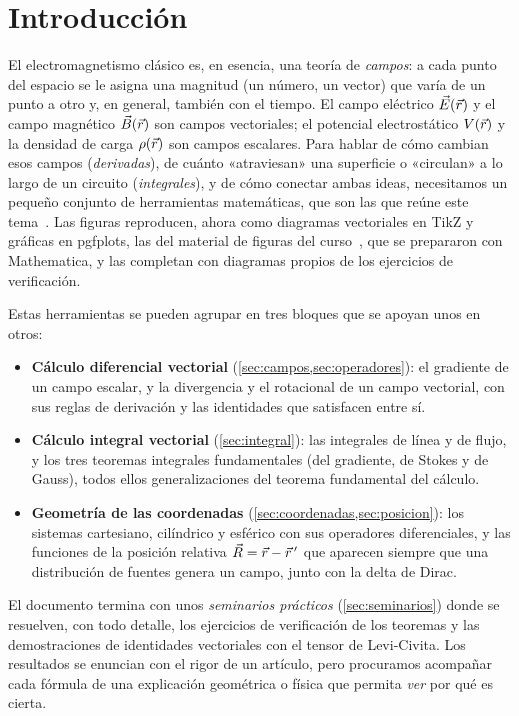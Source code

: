 \section{Introducción}\label{sec:introduccion}
El electromagnetismo clásico es, en esencia, una teoría de \emph{campos}: a
cada punto del espacio se le asigna una magnitud (un número, un vector) que
varía de un punto a otro y, en general, también con el tiempo. El campo
eléctrico $\vec{E}(\vec{r})$ y el campo magnético $\vec{B}(\vec{r})$ son campos
vectoriales; el potencial electrostático $V(\vec{r})$ y la densidad de carga
$\rho(\vec{r})$ son campos escalares. Para hablar de cómo cambian esos campos
(\emph{derivadas}), de cuánto «atraviesan» una superficie o «circulan» a lo
largo de un circuito (\emph{integrales}), y de cómo conectar ambas ideas,
necesitamos un pequeño conjunto de herramientas matemáticas, que son las que
reúne este tema~\cite{NAVAS,GRIFFITHS,ARFKEN}. Las figuras reproducen, ahora como
diagramas vectoriales en TikZ y gráficas en pgfplots, las del material de
figuras del curso~\cite{FIGURAS-T0}, que se prepararon con Mathematica, y las completan con
diagramas propios de los ejercicios de verificación.

Estas herramientas se pueden agrupar en tres bloques que se apoyan unos en
otros:
\begin{itemize}
  \item \textbf{Cálculo diferencial vectorial} (\cref{sec:campos,sec:operadores}):
        el gradiente de un campo escalar, y la divergencia y el rotacional de un
        campo vectorial, con sus reglas de derivación y las identidades que
        satisfacen entre sí.
  \item \textbf{Cálculo integral vectorial} (\cref{sec:integral}): las integrales
        de línea y de flujo, y los tres teoremas integrales fundamentales
        (del gradiente, de Stokes y de Gauss), todos ellos generalizaciones del
        teorema fundamental del cálculo.
  \item \textbf{Geometría de las coordenadas} (\cref{sec:coordenadas,sec:posicion}):
        los sistemas cartesiano, cilíndrico y esférico con sus operadores
        diferenciales, y las funciones de la posición relativa
        $\vec{R}=\vec{r}-\vec{r}\,'$ que aparecen siempre que una distribución
        de fuentes genera un campo, junto con la delta de Dirac.
\end{itemize}
El documento termina con unos \emph{seminarios prácticos} (\cref{sec:seminarios})
donde se resuelven, con todo detalle, los ejercicios de verificación de los
teoremas y las demostraciones de identidades vectoriales con el tensor de
Levi-Civita. Los resultados se enuncian con el rigor de un artículo, pero
procuramos acompañar cada fórmula de una explicación geométrica o física que
permita \emph{ver} por qué es cierta.


